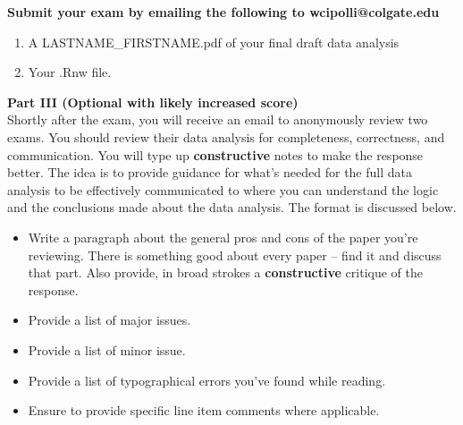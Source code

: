\documentclass{article}
\begin{document}
\noindent \textbf{Submit your exam by emailing the following to wcipolli@colgate.edu}
\begin{enumerate}
  \item A LASTNAME\_FIRSTNAME.pdf of your final draft data analysis
  \item Your .Rnw file.
\end{enumerate}

\noindent \textbf{Part III (Optional with likely increased score)}\\
Shortly after the exam, you will receive an email to anonymously review two exams.
You should review their data analysis for completeness, correctness, and 
communication. You will type up \textbf{constructive} notes to make the response better. 
The idea is to provide guidance for what's needed for the full data analysis to be effectively 
communicated to where you can understand the logic and the conclusions made about the data analysis.
The format is discussed below.
\begin{itemize}
  \item Write a paragraph about the general pros and cons of the paper you're reviewing. There 
  is something good about every paper -- find it and discuss that part. Also provide, in broad strokes a 
  \textbf{constructive} critique of the response. 
  \item Provide a list of major issues.
  \item Provide a list of minor issue.
  \item Provide a list of typographical errors you've found while reading.
  \item Ensure to provide specific line item comments where applicable.
\end{itemize}
\end{document}
